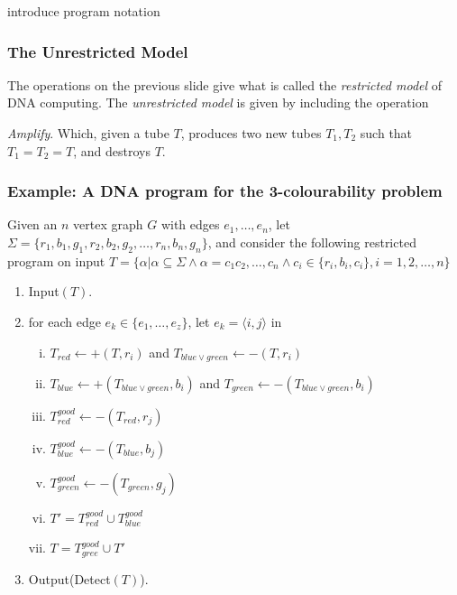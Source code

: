 \documentclass{beamer}
\begin{document}
\begin{frame}

introduce program notation
\end{frame}

\begin{frame}
\frametitle{The Unrestricted Model}

The operations on the previous slide give what is called the \emph{restricted model} of DNA computing. The \emph{unrestricted model} is given by including the operation

\emph{Amplify}. Which, given a tube $T$, produces two new tubes $T_1, T_2$ such that $T_1 = T_2 = T$, and destroys $T$.
\end{frame}

\begin{frame}
\frametitle{Example: A DNA program for the 3-colourability problem}

Given an $n$ vertex graph $G$ with edges $e_1,\ldots,e_n$, let $\Sigma = \{r_1,b_1,g_1,r_2,b_2,g_2,\ldots,r_n,b_n,g_n\}$, and consider the following restricted program on input $T = \{\alpha | \alpha \subseteq \Sigma \wedge \alpha = c_1c_2,\ldots,c_n \wedge c_i \in \{r_i,b_i,c_i\}, i = 1,2,\ldots,n \}$

\begin{enumerate}[(1)]
\item Input$(T)$.
\item for each edge $e_k \in \{e_1,\ldots,e_z\}$, let $e_k = \langle i,j \rangle$ in
  \begin{enumerate}[(i)]
  \item $T_{red} \leftarrow +(T,r_i)$ and $T_{blue \vee green} \leftarrow -(T,r_i)$
  \item $T_{blue} \leftarrow +(T_{blue \vee green},b_i)$ and $T_{green} \leftarrow -(T_{blue \vee green},b_i)$
  \item $T_{red}^{good} \leftarrow -(T_{red},r_j)$
  \item $T_{blue}^{good} \leftarrow -(T_{blue},b_j)$
  \item $T_{green}^{good} \leftarrow -(T_{green},g_j)$
  \item $T' = T_{red}^{good} \cup T_{blue}^{good}$
  \item $T = T_{gree}^{good} \cup T'$
  \end{enumerate}
\item Output(Detect$(T)$).
\end{enumerate}
\end{frame}
\end{document}
